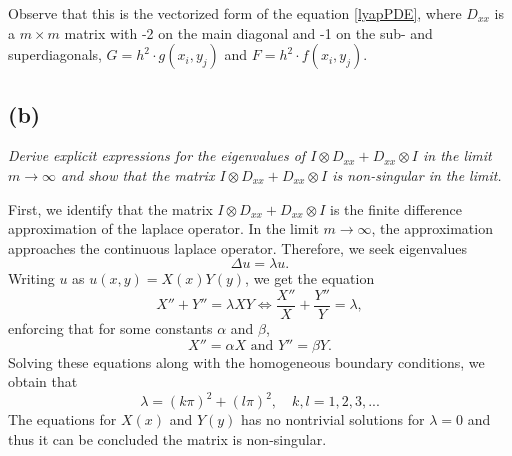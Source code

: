 Observe that this is the vectorized form of the equation \eqref{lyapPDE}, where
$D_{xx}$ is a $m\times m$ matrix with -2 on the main diagonal and -1 on the sub- and superdiagonals, $G =h^2\cdot g(x_i,y_j)$ and $F = h^2\cdot f(x_i,y_j)$. 
\subsection*{(b)}
\emph{Derive explicit expressions for the eigenvalues of $I\otimes D_{xx}+D_{xx}\otimes I$ in the limit $m\to\infty$ and show that the matrix $I\otimes D_{xx}+D_{xx}\otimes I$ is non-singular in the limit.}

First, we identify that the matrix $I\otimes D_{xx}+D_{xx}\otimes I$ is the finite difference approximation of the laplace operator. In the limit $m\to\infty$, the approximation approaches the continuous laplace operator. Therefore, we seek eigenvalues
\begin{equation}
\Delta u = \lambda u.
\end{equation} 
Writing $u$ as $u(x,y) = X(x)Y(y)$, we get the equation
\begin{equation}
X''+Y'' = \lambda XY \Leftrightarrow \frac{X''}{X}+\frac{Y''}{Y} = \lambda,
\end{equation}
enforcing that for some constants $\alpha$ and $\beta$, 
\begin{equation}
X''=\alpha X\text{ and }Y'' = \beta Y.
\end{equation}
Solving these equations along with the homogeneous boundary conditions, we obtain that 
\begin{equation}
\lambda = (k\pi)^2+(l\pi)^2,\quad k,l = 1,2,3,...
\end{equation}
The equations for $X(x)$ and $Y(y)$ has no nontrivial solutions for $\lambda =0$ and thus it can be concluded the matrix is non-singular. 
